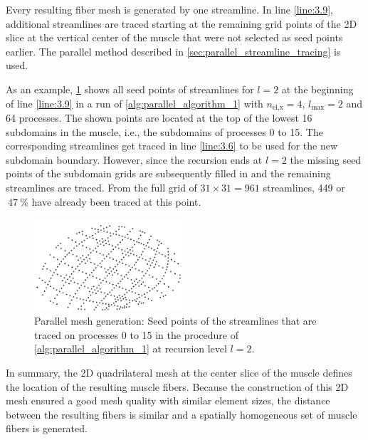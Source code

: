 Every resulting fiber mesh is generated by one streamline. In line \ref{line:3.9}, additional streamlines are traced starting at the remaining grid points of the 2D slice at the vertical center of the muscle that were not selected as seed points earlier. The parallel method described in \cref{sec:parallel_streamline_tracing} is used.

As an example, \cref{fig:seed_points_level2} shows all seed points of streamlines for $l=2$ at the beginning of line \ref{line:3.9} in a run of \cref{alg:parallel_algorithm_1} with $n_\text{el,x}=4$, $l_\text{max}=2$ and 64 processes. 
The shown points are located at the top of the lowest 16 subdomains in the muscle, i.e., the subdomains of processes 0 to 15. The corresponding streamlines get traced in line \ref{line:3.6} to be used for the new subdomain boundary. However, since the recursion ends at $l=2$ the missing seed points of the subdomain grids are subsequently filled in and the remaining streamlines are traced. From the full grid of $31\times 31=\num{961}$ streamlines, \num{449} or $~\SI{47}{\percent}$ have already been traced at this point.

\begin{figure}
  \centering
  \includegraphics[width=0.5\textwidth]{images/parallel_fiber_estimation/seed_points_level2.png}
  \caption{Parallel mesh generation: Seed points of the streamlines that are traced on processes 0 to 15 in the procedure of \cref{alg:parallel_algorithm_1} at recursion level $l=2$.}
  \label{fig:seed_points_level2}%
\end{figure}


In summary, the 2D quadrilateral mesh at the center slice of the muscle defines the location of the resulting muscle fibers. Because the construction of this 2D mesh ensured a good mesh quality with similar element sizes, the distance between the resulting fibers is similar and a spatially homogeneous set of muscle fibers is generated.

